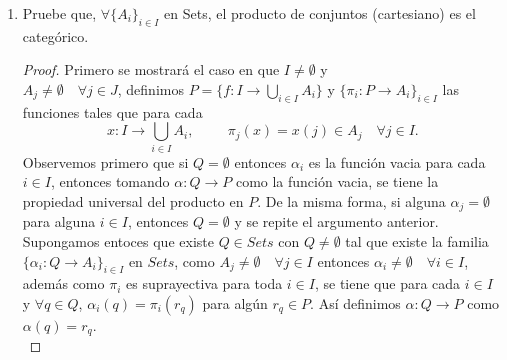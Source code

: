 \documentclass{article}
\begin{document}
\begin{enumerate}[label=\textbf{Ej \arabic*.}]
\textbf{Notación:} En una categoría $\mathscr{C}$ con objeto cero, para cada $\{A_i\}_{i\in I}$ en $\mathscr{C}$, se define la familia de morfismos
$\delta^A_i:=\{\delta^A_{ij}:A_i\to A_j\}_{(i,j)\in I^2}$ en $\mathscr{C}$\\

\centerline{
$\delta^A_{i,j}:=\left\{ 
\begin{array}{c} 0\quad \text{si}\quad i\neq j\\ 1_{A_j}\quad \text{si}\quad i=j\,.
\end{array}\right .$
}
\begin{proof}
Como $I=\emptyset$ por vacuidad se tiene que para todo $C\in \mathscr{C}$, se tiene una familia $\{\alpha_i:C\to A_i\}_{i\in I}$ en $\mathscr{C}$.
Entonces (puesto que el producto existe) existe una única $\alpha:C\to P$ tal que $\pi_i\alpha=\alpha_i\quad \forall i\in I$, donde $\pi_i$ 
son los morfismos que cumplen la propiedad universal del producto. Si existiera otro morfismo $\gamma:C\to P$ éste cumpliría por vacuidad que 
$\pi_i\gamma=\alpha_i\quad \forall i\in I$, y como existe un único morfismo con esta propiedad, tenemos que para cada objeto $C\in \mathscr{C}\quad 
\big|\operatorname{Hom}_{\mathscr{C}}(C,P)\big|=1$ por lo que $P$ es objeto final.
\end{proof}
\item Pruebe que, $\forall \{A_i\}_{i\in I}$ en Sets, el producto de conjuntos (cartesiano) es el categórico. 

\begin{proof}
Primero se mostrará el caso en que $I\neq \emptyset$ y \\$A_j\neq \emptyset\quad \forall j\in J$, definimos $P=\{f:I\to \displaystyle\bigcup_{i\in I}A_i\}$ y
$ \{\pi_i:P\to A_i\}_{i\in I}$ las funciones tales que para cada 
\[x:I\to \displaystyle\bigcup_{i\in I}A_i, \hspace{1cm} \pi_j(x)=x(j)\in A_j\quad \forall j\in I.
\]
Observemos primero que si $Q=\emptyset$ entonces $\alpha_i$ es la función vacia para cada $i\in I$, entonces tomando $\alpha:Q\to P$ como la función
vacia, se tiene la propiedad universal del producto en $P$. De la misma forma, si alguna $\alpha_j=\emptyset$ para alguna $i\in I$, 
entonces $Q=\emptyset$ y se repite el argumento anterior.\\

Supongamos entoces que existe $Q\in Sets$ con $Q\neq \emptyset$ tal que existe la familia $\{\alpha_i:Q\to A_i\}_{i\in I}$ en $Sets$, 
como $A_j\neq \emptyset\quad \forall j\in I$
entonces $\alpha_i\neq \emptyset\quad \forall i\in I$, además como $\pi_i$ es suprayectiva
para toda $i\in I$, se tiene que para cada $i\in I$ y $\forall q\in Q$, $\alpha_i(q)=\pi_i(r_q)$ para algún $r_q\in P$. 
Así definimos $\alpha:Q\to P$ como $\alpha(q)=r_q$.\\


\end{proof}
\end{enumerate}
\end{document}

